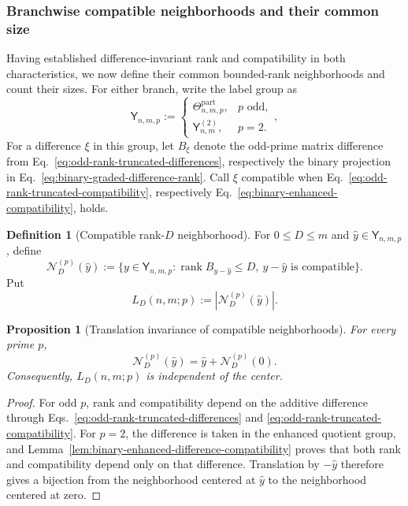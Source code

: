 \documentclass[11pt]{article}
\newcommand{\rank}{\operatorname{rank}}
\newcommand{\1}{\mathbf 1}
\theoremstyle{plain}
\newtheorem{proposition}[theorem]{Proposition}
\theoremstyle{definition}
\newtheorem{definition}[theorem]{Definition}
\theoremstyle{remark}
\begin{document}
\subsubsection{Branchwise compatible neighborhoods and their common size}
Having established difference-invariant rank and compatibility in both  
characteristics, we now define their common bounded-rank neighborhoods and  
count their sizes.  For either branch, write the label group as  
\begin{equation}
 \mathsf Y_{n,m,p}:=
 \begin{cases}
 \Theta_{n,m,p}^{\mathrm{part}},&p\text{ odd},\\
 \mathsf Y_{n,m}^{(2)},&p=2.
 \end{cases},
 \label{eq:graded-common-label-group}
\end{equation}
For a difference $\xi$ in this group, let $B_\xi$ denote the odd-prime matrix
difference from Eq.~\eqref{eq:odd-rank-truncated-differences}, respectively
the binary projection in Eq.~\eqref{eq:binary-graded-difference-rank}.  Call
$\xi$ compatible when Eq.~\eqref{eq:odd-rank-truncated-compatibility},
respectively Eq.~\eqref{eq:binary-enhanced-compatibility}, holds.

\begin{definition}[Compatible rank-$D$ neighborhood]
\label{def:compatible-rank-neighborhood}
For $0\le D\le m$ and
$\widehat y\in\mathsf Y_{n,m,p}$, define
\begin{equation}
 \mathcal N_D^{(p)}(\widehat y)
 :=\{y\in\mathsf Y_{n,m,p}:
       \rank B_{y-\widehat y}\le D,
       \ y-\widehat y\text{ is compatible}\}.
 \label{eq:compatible-rank-neighborhood}
\end{equation}
Put
\begin{equation}
 L_D(n,m;p):=|\mathcal N_D^{(p)}(\widehat y)|.
 \label{eq:compatible-rank-list-size}
\end{equation}
\end{definition}

\begin{proposition}[Translation invariance of compatible neighborhoods]
\label{prop:compatible-neighborhood-translation}
For every prime $p$,
\begin{equation}
 \mathcal N_D^{(p)}(\widehat y)
 =\widehat y+\mathcal N_D^{(p)}(0).
 \label{eq:compatible-neighborhood-translation}
\end{equation}
Consequently, $L_D(n,m;p)$ is independent of the center.
\end{proposition}
\begin{proof}
For odd $p$, rank and compatibility depend on the additive difference through
Eqs.~\eqref{eq:odd-rank-truncated-differences} and
\eqref{eq:odd-rank-truncated-compatibility}.  For $p=2$, the difference is
taken in the enhanced quotient group, and
Lemma~\ref{lem:binary-enhanced-difference-compatibility} proves that both rank
and compatibility depend only on that difference.  Translation by
$-\widehat y$ therefore gives a bijection from the neighborhood centered at
$\widehat y$ to the neighborhood centered at zero.
\end{proof}
\end{document}
